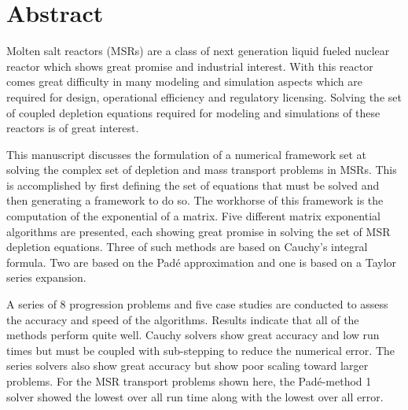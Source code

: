 \chapter*{Abstract}\label{ch:abstract}
Molten salt reactors (MSRs) are a class of next generation liquid fueled nuclear reactor which shows great promise and industrial interest. With this reactor comes great difficulty in many modeling and simulation aspects which are required for design, operational efficiency and regulatory licensing. Solving the set of coupled depletion equations required for modeling and simulations of these reactors is of great interest. 

This manuscript discusses the formulation of a numerical framework set at solving the complex set of depletion and mass transport problems in MSRs. This is accomplished by first defining the set of equations that must be solved and then generating a framework to do so. The workhorse of this framework is the computation of the exponential of a matrix. Five different matrix exponential algorithms are presented, each showing great promise in solving the set of MSR depletion equations. Three of such methods are based on Cauchy's integral formula. Two are based on the Pad\'e approximation and one is based on a Taylor series expansion. 

A series of 8 progression problems and five case studies are conducted to assess the accuracy and speed of the algorithms. Results indicate that all of the methods perform quite well. Cauchy solvers show great accuracy and low run times but must be coupled with sub-stepping to reduce the numerical error. The series solvers also show great accuracy but show poor scaling toward larger problems. For the MSR transport problems shown here, the Pad\'e-method 1 solver showed the lowest over all run time along with the lowest over all error. 